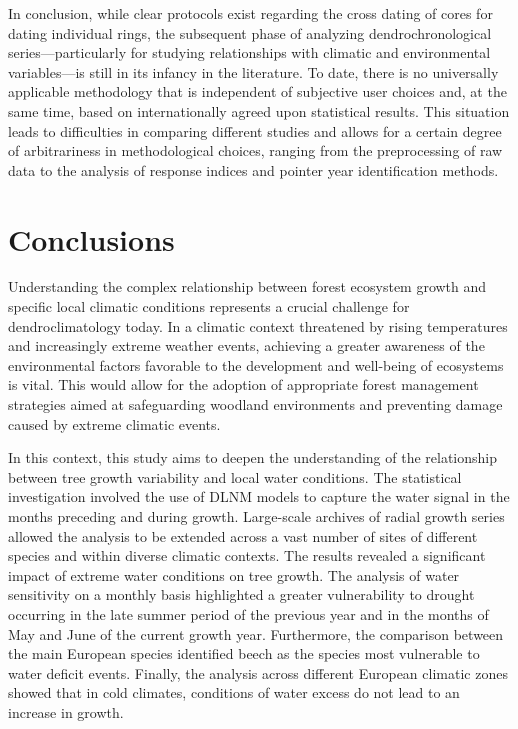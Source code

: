 \documentclass[12pt, a4paper]{article}
\begin{document}
In conclusion, while clear protocols exist regarding the cross dating of cores for dating individual rings, the subsequent phase of analyzing dendrochronological series—particularly for studying relationships with climatic and environmental variables—is still in its infancy in the literature. To date, there is no universally applicable methodology that is independent of subjective user choices and, at the same time, based on internationally agreed upon statistical results. This situation leads to difficulties in comparing different studies and allows for a certain degree of arbitrariness in methodological choices, ranging from the preprocessing of raw data to the analysis of response indices and pointer year identification methods.


\section{Conclusions}

Understanding the complex relationship between forest ecosystem growth and specific local climatic conditions represents a crucial challenge for dendroclimatology today. In a climatic context threatened by rising temperatures and increasingly extreme weather events, achieving a greater awareness of the environmental factors favorable to the development and well-being of ecosystems is vital. This would allow for the adoption of appropriate forest management strategies aimed at safeguarding woodland environments and preventing damage caused by extreme climatic events.

In this context, this study aims to deepen the understanding of the relationship between tree growth variability and local water conditions. The statistical investigation involved the use of DLNM models to capture the water signal in the months preceding and during growth. Large-scale archives of radial growth series allowed the analysis to be extended across a vast number of sites of different species and within diverse climatic contexts. The results revealed a significant impact of extreme water conditions on tree growth. The analysis of water sensitivity on a monthly basis highlighted a greater vulnerability to drought occurring in the late summer period of the previous year and in the months of May and June of the current growth year. Furthermore, the comparison between the main European species identified beech as the species most vulnerable to water deficit events. Finally, the analysis across different European climatic zones showed that in cold climates, conditions of water excess do not lead to an increase in growth.
\end{document}

